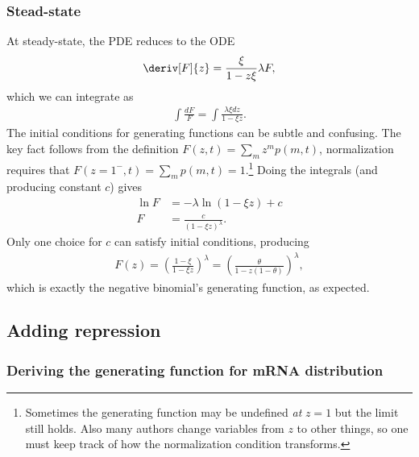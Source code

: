 \subsubsection{Stead-state}
At steady-state, the PDE reduces to the ODE
\begin{align}
\deriv[F]{z} = \frac{\xi}{1-z\xi}\lambda F,
\end{align}
which we can integrate as
\begin{align}
\int \frac{dF}{F} = \int \frac{\lambda\xi dz}{1-\xi z}.
\end{align}
The initial conditions for generating functions can be subtle and confusing.
The key fact follows from the definition
$F(z,t) = \sum_m z^m p(m,t)$,
normalization requires that
$F(z=1^-,t) = \sum_m p(m,t) = 1$.\footnote{
Sometimes the generating function may be undefined \textit{at} $z=1$ but the
limit still holds. Also many authors change variables from $z$ to other
things, so one must keep track of how the normalization condition transforms.
}
Doing the integrals (and producing constant $c$) gives
\begin{align}
\ln F &= -\lambda \ln(1-\xi z) + c
\\
F &= \frac{c}{(1-\xi z)^\lambda}.
\end{align}
Only one choice for $c$ can satisfy initial conditions, producing
\begin{align}
F(z) = \left(\frac{1-\xi}{1-\xi z}\right)^\lambda
        = \left(\frac{\theta}{1 - z(1-\theta)}\right)^\lambda,
\end{align}
which is exactly the negative binomial's generating function, as expected.

\subsection{Adding repression}
\subsubsection{Deriving the generating function for mRNA distribution}

